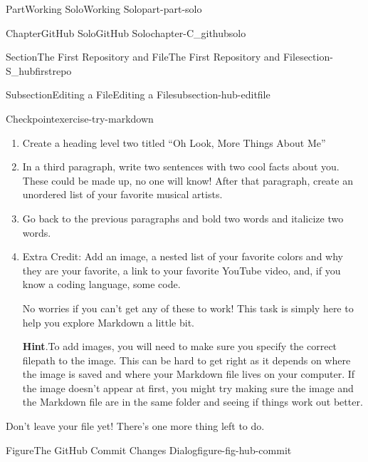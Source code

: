 \documentclass[oneside,10pt,]{book}
\newcommand{\blocktitlefont}{\relax}
\begin{document}
\begin{partptx}{Part}{Working Solo}{}{Working Solo}{}{}{part-part-solo}
\begin{chapterptx}{Chapter}{GitHub Solo}{}{GitHub Solo}{}{}{chapter-C_githubsolo}
\begin{sectionptx}{Section}{The First Repository and File}{}{The First Repository and File}{}{}{section-S_hubfirstrepo}
\begin{subsectionptx}{Subsection}{Editing a File}{}{Editing a File}{}{}{subsection-hub-editfile}
\begin{inlineexercise}{Checkpoint}{}{exercise-try-markdown}
\begin{enumerate}[font=\bfseries,label=(\alph*),ref=\alph*]
\item{}Create a heading level two titled ``Oh Look, More Things About Me''%
\item{}In a third paragraph, write two sentences with two cool facts about you. These could be made up, no one will know! After that paragraph, create an unordered list of your favorite musical artists.%
\item{}Go back to the previous paragraphs and bold two words and italicize two words.%
\item{}Extra Credit: Add an image, a nested list of your favorite colors and why they are your favorite, a link to your favorite YouTube video, and, if you know a coding language, some code.%
\par
No worries if you can't get any of these to work! This task is simply here to help you explore Markdown a little bit.%
\par\smallskip%
\noindent\textbf{\blocktitlefont Hint}.\hypertarget{hint-try-markdown-i-b}{}\quad{}To add images, you will need to make sure you specify the correct filepath to the image. This can be hard to get right as it depends on where the image is saved and where your Markdown file lives on your computer. If the image doesn't appear at first, you might try making sure the image and the Markdown file are in the same folder and seeing if things work out better.%
\end{enumerate}%
Don't leave your file yet! There's one more thing left to do.%
\end{inlineexercise}%
%
\begin{figureptx}{Figure}{The GitHub Commit Changes Dialog}{figure-fig-hub-commit}{}%
\begin{image}{0.15}{0.7}{0.15}{}%

\end{image}
\end{figureptx}
\end{subsectionptx}
\end{sectionptx}
\end{chapterptx}
\end{partptx}
\end{document}
